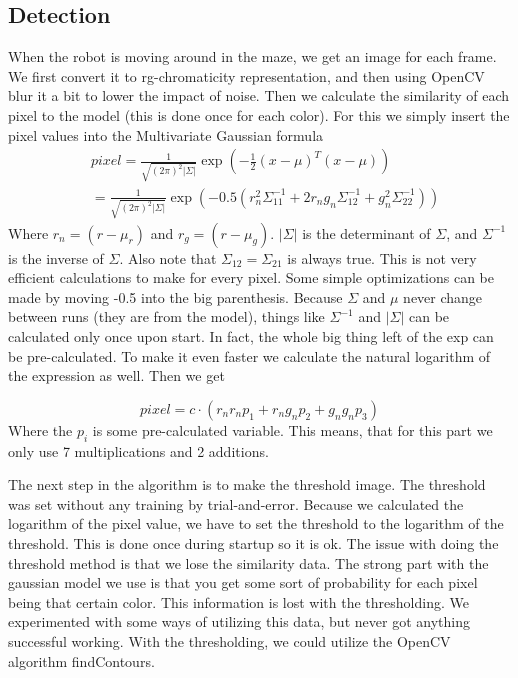 \documentclass[10pt,a4paper,twocolumn]{article}
\begin{document}
\subsection{Detection}
When the robot is moving around in the maze, we get an image for each frame. We
first convert it to rg-chromaticity representation, and then using OpenCV blur
it a bit to lower the impact of noise. Then we calculate the similarity of each
pixel to the model (this is done once for each color). For this we simply insert
the pixel values into the Multivariate Gaussian formula
\begin{align}
  &pixel=\frac{1}{\sqrt{(2\pi)^2|\Sigma|}}\exp\left(-\frac{1}{2}(x-\mu)^T(x-\mu)\right)\\
  &  =\frac{1}{\sqrt{(2\pi)^2|\Sigma|}}\exp\left(-0.5(r_n^2\Sigma_{11}^{-1}+2r_ng_n\Sigma_{12}^{-1}+g_n^2\Sigma_{22}^{-1})\right)
\end{align}
Where $r_n= (r-\mu_r)$ and $r_g= (r-\mu_g)$. $|\Sigma|$ is the determinant of
$\Sigma$, and $\Sigma^{-1}$ is the inverse of $\Sigma$. Also note that
$\Sigma_{12}= \Sigma_{21}$ is always true. This is not very efficient
calculations to make for every pixel. Some simple optimizations can be made by
moving -0.5 into the big parenthesis. Because $\Sigma$ and $\mu$ never change
between runs (they are from the model), things like $\Sigma^{-1}$ and $|\Sigma|$
can be calculated only once upon start. In fact, the whole big thing left of the
exp can be pre-calculated. To make it even faster we calculate the natural
logarithm of the expression as well. Then we get

\begin{equation}
  pixel=c\cdot(r_nr_np_1+r_ng_np_2+g_ng_np_3)
\end{equation}
Where the $p_i$ is some pre-calculated variable. This means, that for this part
we only use 7 multiplications and 2 additions.

The next step in the algorithm is to make the threshold image. The threshold was
set without any training by trial-and-error. Because we calculated the logarithm
of the pixel value, we have to set the threshold to the logarithm of the
threshold. This is done once during startup so it is ok. The issue with doing
the threshold method is that we lose the similarity data. The strong part with
the gaussian model we use is that you get some sort of probability for each
pixel being that certain color. This information is lost with the thresholding.
We experimented with some ways of utilizing this data, but never got anything
successful working. With the thresholding, we could utilize the OpenCV algorithm
findContours.
\end{document}
